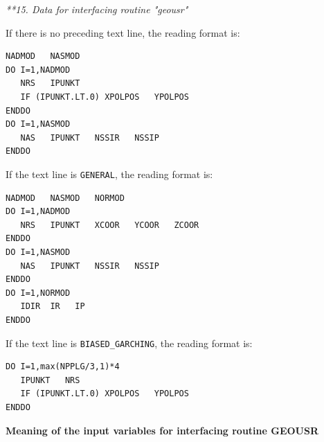 \documentclass[a4paper,10pt]{report}
\begin{document}
{\it ***15. Data for interfacing routine "geousr"}

If there is no preceding text line, the reading format is:
\begin{verbatim}
NADMOD   NASMOD
DO I=1,NADMOD
   NRS   IPUNKT
   IF (IPUNKT.LT.0) XPOLPOS   YPOLPOS
ENDDO
DO I=1,NASMOD
   NAS   IPUNKT   NSSIR   NSSIP
ENDDO
\end{verbatim}

If the text line is {\tt GENERAL}, the reading format is:
\begin{verbatim}
NADMOD   NASMOD   NORMOD
DO I=1,NADMOD
   NRS   IPUNKT   XCOOR   YCOOR   ZCOOR
ENDDO
DO I=1,NASMOD
   NAS   IPUNKT   NSSIR   NSSIP
ENDDO
DO I=1,NORMOD
   IDIR  IR   IP
ENDDO
\end{verbatim}

If the text line is {\tt BIASED\_GARCHING}, the reading format is:
\begin{verbatim}
DO I=1,max(NPPLG/3,1)*4
   IPUNKT   NRS
   IF (IPUNKT.LT.0) XPOLPOS   YPOLPOS
ENDDO
\end{verbatim}

{\bf Meaning of the input variables for interfacing routine GEOUSR}
\end{document}
